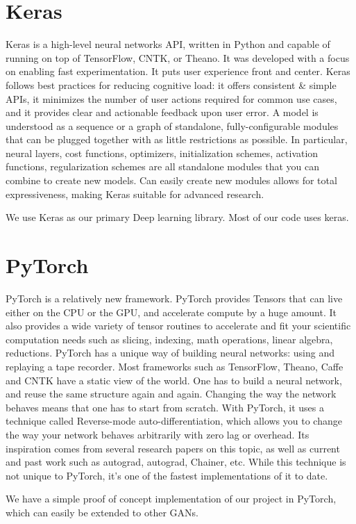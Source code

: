 \section{Keras} %
\label{sec:keras}
Keras is a high-level neural networks API, written in Python and capable of running on top of TensorFlow, CNTK, or Theano. It was developed with a focus on enabling fast experimentation. It puts user experience front and center. Keras follows best practices for reducing cognitive load: it offers consistent \& simple APIs, it minimizes the number of user actions required for common use cases, and it provides clear and actionable feedback upon user error. A model is understood as a sequence or a graph of standalone, fully-configurable modules that can be plugged together with as little restrictions as possible. In particular, neural layers, cost functions, optimizers, initialization schemes, activation functions, regularization schemes are all standalone modules that you can combine to create new models. Can easily create new modules allows for total expressiveness, making Keras suitable for advanced research.\par\bigskip
We use Keras as our primary Deep learning library. Most of our code uses keras. 

\section{PyTorch} %
\label{sec:pytorch}
PyTorch is a relatively new framework. PyTorch provides Tensors that can live either on the CPU or the GPU, and accelerate compute by a huge amount. It also provides a wide variety of tensor routines to accelerate and fit your scientific computation needs such as slicing, indexing, math operations, linear algebra, reductions. PyTorch has a unique way of building neural networks: using and replaying a tape recorder. Most frameworks such as TensorFlow, Theano, Caffe and CNTK have a static view of the world. One has to build a neural network, and reuse the same structure again and again. Changing the way the network behaves means that one has to start from scratch. With PyTorch, it uses a technique called Reverse-mode auto-differentiation, which allows you to change the way your network behaves arbitrarily with zero lag or overhead. Its inspiration comes from several research papers on this topic, as well as current and past work such as autograd, autograd, Chainer, etc. While this technique is not unique to PyTorch, it’s one of the fastest implementations of it to date. \par\bigskip
We have a simple proof of concept implementation of our project in PyTorch, which can easily be extended to other GANs.

